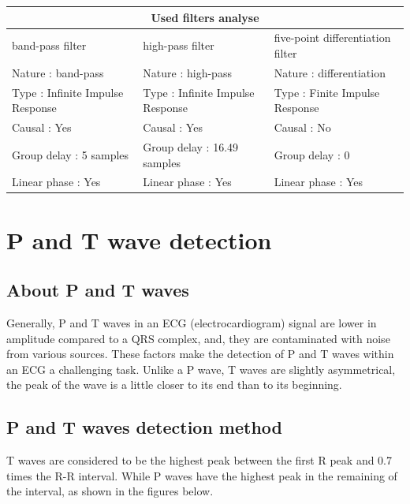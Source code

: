 \documentclass{article}
\begin{document}
\begin{tabular}{ |p{5cm}|p{5cm}|p{5cm}|  }
\hline
\multicolumn{3}{|c|}{Used filters analyse} \\
\hline
band-pass filter &  high-pass filter & five-point differentiation filter\\
\hline
Nature : band-pass & Nature : high-pass & Nature : differentiation\\
Type : Infinite Impulse Response & Type : Infinite Impulse Response & Type : Finite Impulse Response \\
Causal : Yes & Causal : Yes   & Causal : No \\
Group delay : 5 samples &Group delay : 16.49 samples & Group delay : 0 \\
Linear phase : Yes & Linear phase : Yes & Linear phase : Yes\\
\hline
\end{tabular}

\newpage

\section{P and T wave detection}
\subsection{About P and T waves}

Generally, P and T waves in an  ECG (electrocardiogram) signal are lower in amplitude compared to a QRS complex, and, they are contaminated with noise from various sources. These factors make the detection of P and T waves within an ECG a challenging task. Unlike a P wave, T waves are slightly asymmetrical,  the peak of the wave is a little closer to its end than to its beginning.
\subsection{P and T waves detection method}
T waves are considered to be the highest peak between the first R peak and 0.7 times the R-R interval. While P waves have the highest peak in the remaining of the interval, as shown in the figures below.
\end{document}
